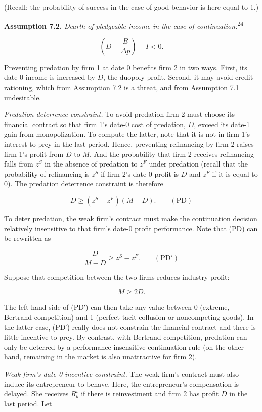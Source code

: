 \documentclass[11pt,a4paper]{article}
\begin{document}
(Recall: the probability of success in the case of good behavior is here equal to 1.)

\textbf{Assumption 7.2.} \emph{Dearth of pledgeable income in the case of
continuation:}\textsuperscript{24}

\[\left(D - \frac{B}{\Delta p}\right) - I < 0.\]

Preventing predation by firm 1 at date 0 benefits firm 2 in two ways. First, its date-0 income is
increased by \(D\), the duopoly profit. Second, it may avoid credit rationing, which from Assumption
7.2 is a threat, and from Assumption 7.1 undesirable.

\emph{Predation deterrence constraint.} To avoid predation firm 2 must choose its financial contract
so that firm 1's date-0 cost of predation, \(D\), exceed its date-1 gain from monopolization. To
compute the latter, note that it is not in firm 1's interest to prey in the last period. Hence,
preventing refinancing by firm 2 raises firm 1's profit from \(D\) to \(M\). And the probability
that firm 2 receives refinancing falls from \(z^S\) in the absence of predation to \(z^F\) under
predation (recall that the probability of refinancing is \(z^S\) if firm 2's date-0 profit is \(D\)
and \(z^F\) if it is equal to 0). The predation deterrence constraint is therefore

\[D \geqslant (z^S - z^F)(M - D). \qquad (\text{PD})\]

To deter predation, the weak firm's contract must make the continuation decision relatively
insensitive to that firm's date-0 profit performance. Note that (PD) can be rewritten as

\[\frac{D}{M - D} \geqslant z^S - z^F. \qquad (\text{PD}')\]

Suppose that competition between the two firms reduces industry profit:

\[M \geqslant 2D.\]

The left-hand side of (PD′) can then take any value between 0 (extreme, Bertrand competition) and 1
(perfect tacit collusion or noncompeting goods). In the latter case, (PD′) really does not constrain
the financial contract and there is little incentive to prey. By contrast, with Bertrand
competition, predation can only be deterred by a performance-insensitive continuation rule (on the
other hand, remaining in the market is also unattractive for firm 2).

\emph{Weak firm's date-0 incentive constraint.} The weak firm's contract must also induce its
entrepreneur to behave. Here, the entrepreneur's compensation is delayed. She receives \(R_b^i\) if
there is reinvestment and firm 2 has profit \(D\) in the last period. Let
\end{document}

